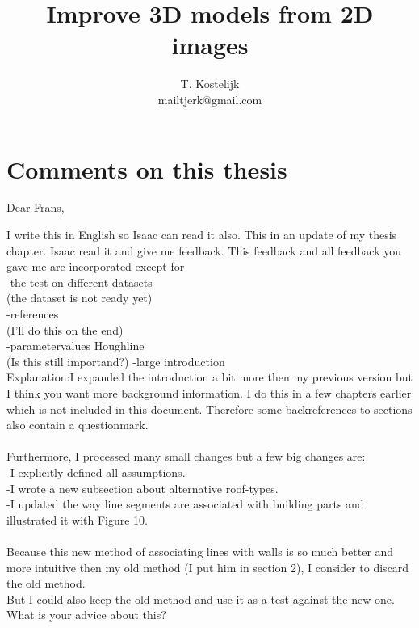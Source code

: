 \documentclass[10pt]{article}
\title{\sc Improve 3D models from 2D images}
\author{T. Kostelijk\\mailtjerk@gmail.com}
\begin{document}
\maketitle




\section{Comments on this thesis}
Dear Frans,

I write this in English so Isaac can read it also.
This in an update of my thesis chapter. Isaac read it and give me feedback. This feedback and all feedback you gave me are incorporated except for\\
-the test on different datasets\\
(the dataset is not ready yet)\\
-references\\
(I'll do this on the end)\\
-parametervalues Houghline\\
(Is this still importand?)
-large introduction\\
Explanation:I expanded the introduction a bit more then my previous version but I think you
want more background information. I do this in a few chapters earlier which is
not included in this document. Therefore some backreferences to sections also
contain a questionmark.\\
\\
Furthermore, I processed many small changes but a few big changes are:\\
-I explicitly defined all assumptions.\\
-I wrote a new subsection about alternative roof-types.\\
-I updated the way line segments are associated with building parts and illustrated it with Figure 10.\\
\\
Because this new method of associating lines with walls is so much better and
more intuitive then my old method (I put him in section 2), I consider to
discard the old method.\\ 
But I could also keep the old method and use it as
a test against the new one. What is your advice about this?\\
\end{document}
